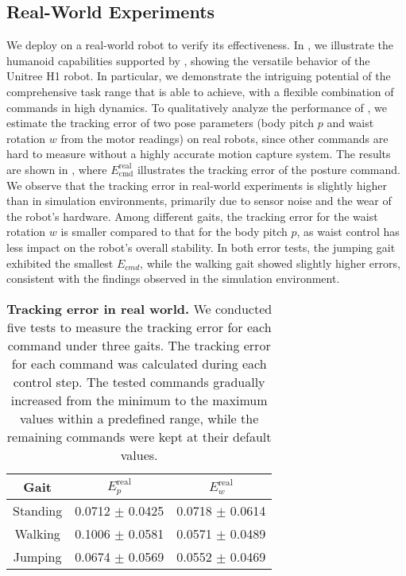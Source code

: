 \subsection{Real-World Experiments}
We deploy \our on a real-world robot to verify its effectiveness. In , we illustrate the humanoid capabilities supported by \our, showing the versatile behavior of the Unitree H1 robot. In particular, we demonstrate the intriguing potential of the comprehensive task range that \our is able to achieve, with a flexible combination of commands in high dynamics. To qualitatively analyze the performance of \our, we estimate the tracking error of two pose parameters (body pitch $p$ and waist rotation $w$ from the motor readings) on real robots, since other commands are hard to measure without a highly accurate motion capture system. The results are shown in , where $E^{\text{real}}_{\text{cmd}}$ illustrates the tracking error of the posture command.
We observe that the tracking error in real-world experiments is slightly higher than in simulation environments, primarily due to sensor noise and the wear of the robot's hardware. Among different gaits, the tracking error for the waist rotation $w$ is smaller compared to that for the body pitch $p$, as waist control has less impact on the robot’s overall stability. In both error tests, the jumping gait exhibited the smallest $E_{cmd}$, while the walking gait showed slightly higher errors, consistent with the findings observed in the simulation environment.

\begin{table}[t]
\centering
\caption{\small \textbf{Tracking error in real world.} We conducted five tests to measure the tracking error for each command under three gaits. The tracking error for each command was calculated during each control step. The tested commands gradually increased from the minimum to the maximum values within a predefined range, while the remaining commands were kept at their default values.} %
\label{tb:track-real}
\begin{tabular}{c|cc} \toprule
Gait     & $E_p^{\text{real}}$ & $E_w^{\text{real}}$ \\ \midrule
Standing & 0.0712 $\pm$ 0.0425 & 0.0718 $\pm$ 0.0614 \\
Walking  & 0.1006 $\pm$ 0.0581  & 0.0571 $\pm$ 0.0489 \\
Jumping  & 0.0674 $\pm$ 0.0569  & 0.0552 $\pm$ 0.0469 \\ \bottomrule
\end{tabular}
\end{table}

